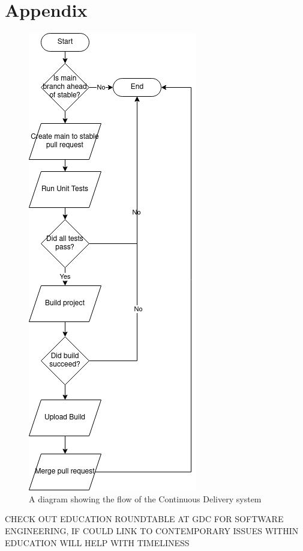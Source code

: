 \documentclass[journal]{IEEEtran}
\begin{document}
\section{Appendix}
\begin{figure}[h!]
    \includegraphics[width=0.95\columnwidth]{Images/CD.png}
    \caption{A diagram showing the flow of the Continuous Delivery system}
    \label{CDflow}
\end{figure}

CHECK OUT EDUCATION ROUNDTABLE AT GDC FOR SOFTWARE ENGINEERING, IF COULD LINK TO CONTEMPORARY ISSUES WITHIN EDUCATION WILL HELP WITH TIMELINESS


\end{document}
